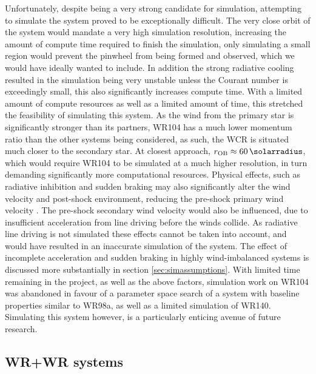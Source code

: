 Unfortunately, despite being a very strong candidate for simulation, attempting to simulate the system proved to be exceptionally difficult.
The very close orbit of the system would mandate a very high simulation resolution, increasing the amount of compute time required to finish the simulation, only simulating a small region would prevent the pinwheel from being formed and observed, which we would have ideally wanted to include.
In addition the strong radiative cooling resulted in the simulation being very unstable unless the Courant number is exceedingly small, this also significantly increases compute time.
With a limited amount of compute resources as well as a limited amount of time, this stretched the feasibility of simulating this system.
As the wind from the primary star is significantly stronger than its partners, WR104 has a much lower momentum ratio than the other systems being considered, as such, the WCR is situated much closer to the secondary star.
At closest approach, $r_\text{OB} \approx \SI{60}{\solarradius}$, which would require WR104 to be simulated at a much higher resolution, in turn demanding significantly more computational resources.
Physical effects, such as radiative inhibition and sudden braking may also significantly alter the wind velocity and post-shock environment, reducing the pre-shock primary wind velocity \textcite{gayley_sudden_1997}.
The pre-shock secondary wind velocity would also be influenced, due to insufficient acceleration from line driving before the winds collide.
As radiative line driving is not simulated these effects cannot be taken into account, and would have resulted in an inaccurate simulation of the system.
The effect of incomplete acceleration and sudden braking in highly wind-imbalanced systems is discussed more substantially in section \ref{sec:simassumptions}.
With limited time remaining in the project, as well as the above factors, simulation work on WR104 was abandoned in favour of a parameter space search of a system with baseline properties similar to WR98a, as well as a limited simulation of WR140. 
Simulating this system however, is a particularly enticing avenue of future research.

\subsection{WR+WR systems}

